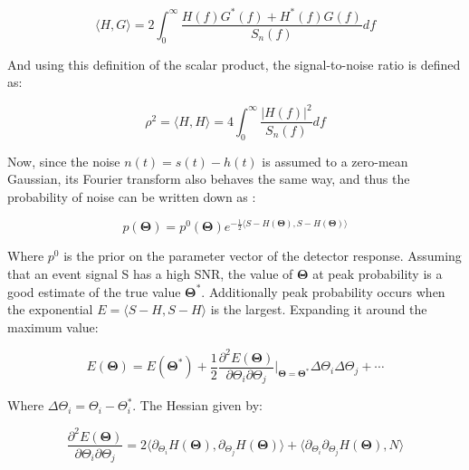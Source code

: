     \begin{equation}
        \langle H, G \rangle =
            2 \int_{0}^{\infty} \dfrac{H(f)G^{\ast}(f) + H^{\ast}(f)G(f)}{S_n(f)} df
    \end{equation}

    And using this definition of the scalar product, the signal-to-noise ratio is
    defined as:

    \begin{equation}
        \rho^2 =
            \langle H, H \rangle =
                4 \int_0^\infty \dfrac{|H(f)|^2}{S_n(f)} df
    \end{equation}

    Now, since the noise $n(t) = s(t) - h(t)$ is assumed to a zero-mean Gaussian, its
    Fourier transform also behaves the same way, and thus the probability of noise can
    be written down as :

    \begin{equation}
        \label{eq:probability}
        p(\mathbf{\Theta}) =
            p^0(\mathbf{\Theta})
            e^{
                -\frac{1}{2}
                \langle S - H(\mathbf{\Theta}), S - H(\mathbf{\Theta}) \rangle
            }
    \end{equation}

    Where $p^0$ is the prior on the parameter vector of the detector response. Assuming
    that an event signal S has a high SNR, the value of $\mathbf{\Theta}$ at peak
    probability is a good estimate of the true value $\mathbf{\Theta}^{\ast}$.
    Additionally peak probability occurs when the exponential $E = \langle S - H, S - H
    \rangle$ is the largest. Expanding it around the maximum value:

    \begin{equation}
        E(\mathbf{\Theta}) =
            E(\mathbf{\Theta}^{\ast}) +
            \dfrac{1}{2}
            \dfrac{\partial^2 E(\mathbf{\Theta})}{\partial \Theta_i \partial \Theta_j}
            \bigg\rvert_{\mathbf{\Theta} =
                \mathbf{\Theta}^{\ast}}
                \Delta\Theta_i \Delta\Theta_j +
                \cdots
    \end{equation}

    Where $\Delta \Theta_i = \Theta_i - \Theta_i^\ast$. The Hessian given by:

    \begin{equation}
        \dfrac{\partial^2 E(\mathbf{\Theta})}{\partial \Theta_i \partial \Theta_j} =
            2 \langle
                  \partial_{\Theta_i} H(\mathbf{\Theta}),
                  \partial_{\Theta_j} H(\mathbf{\Theta})
              \rangle +
              \langle
                  \partial_{\Theta_i} \partial_{\Theta_j} H(\mathbf{\Theta}),
                  N
              \rangle
    \end{equation}

